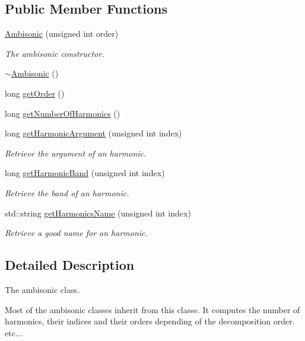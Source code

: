 \subsection*{Public Member Functions}
\begin{DoxyCompactItemize}
\item 
\hyperlink{class_hoa3_d_1_1_ambisonic_a43f91832422c0b59f92f02978dc1e541}{Ambisonic} (unsigned int order)
\begin{DoxyCompactList}\small\item\em The ambisonic constructor. \end{DoxyCompactList}\item 
\hyperlink{class_hoa3_d_1_1_ambisonic_a082fc2e3f9910703ddb49b9a478329bf}{$\sim$\-Ambisonic} ()
\item 
long \hyperlink{class_hoa3_d_1_1_ambisonic_a677405a1c3aa359753bd675d4614e7da}{get\-Order} ()
\item 
long \hyperlink{class_hoa3_d_1_1_ambisonic_aa9d613f38e6876326201995a5a415410}{get\-Number\-Of\-Harmonics} ()
\item 
long \hyperlink{class_hoa3_d_1_1_ambisonic_a3acaabfd013671c94e057e23eea1d068}{get\-Harmonic\-Argument} (unsigned int index)
\begin{DoxyCompactList}\small\item\em Retrieve the argument of an harmonic. \end{DoxyCompactList}\item 
long \hyperlink{class_hoa3_d_1_1_ambisonic_a06ecceb7aef44cd7008fd8beaf8cf33e}{get\-Harmonic\-Band} (unsigned int index)
\begin{DoxyCompactList}\small\item\em Retrieve the band of an harmonic. \end{DoxyCompactList}\item 
std\-::string \hyperlink{class_hoa3_d_1_1_ambisonic_a1b4578538f4fd0d311102b2f3ec4dac6}{get\-Harmonics\-Name} (unsigned int index)
\begin{DoxyCompactList}\small\item\em Retrieve a good name for an harmonic. \end{DoxyCompactList}\end{DoxyCompactItemize}


\subsection{Detailed Description}
The ambisonic class. 

Most of the ambisonic classes inherit from this classe. It computes the number of harmonics, their indices and their orders depending of the decomposition order. etc... 

